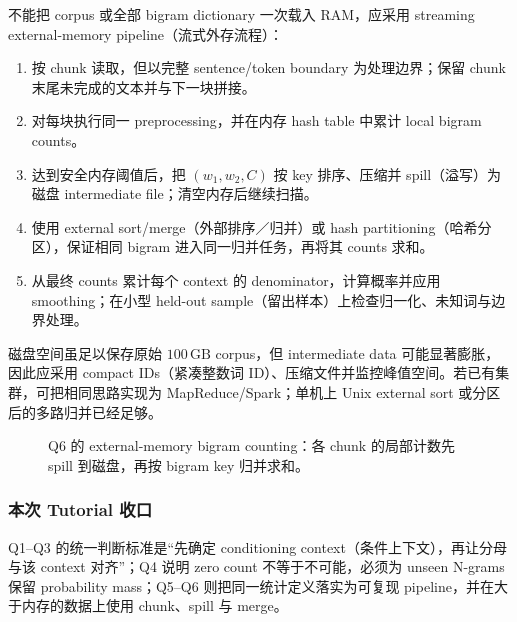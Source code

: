 \begin{checkedsolution}
不能把 corpus 或全部 bigram dictionary 一次载入 RAM，应采用 streaming external-memory pipeline（流式外存流程）：
\begin{enumerate}
  \item 按 chunk 读取，但以完整 sentence/token boundary 为处理边界；保留 chunk 末尾未完成的文本并与下一块拼接。
  \item 对每块执行同一 preprocessing，并在内存 hash table 中累计 local bigram counts。
  \item 达到安全内存阈值后，把 $(w_1,w_2,C)$ 按 key 排序、压缩并 spill（溢写）为磁盘 intermediate file；清空内存后继续扫描。
  \item 使用 external sort/merge（外部排序／归并）或 hash partitioning（哈希分区），保证相同 bigram 进入同一归并任务，再将其 counts 求和。
  \item 从最终 counts 累计每个 context 的 denominator，计算概率并应用 smoothing；在小型 held-out sample（留出样本）上检查归一化、未知词与边界处理。
\end{enumerate}
磁盘空间虽足以保存原始 $100\,\mathrm{GB}$ corpus，但 intermediate data 可能显著膨胀，因此应采用 compact IDs（紧凑整数词 ID）、压缩文件并监控峰值空间。若已有集群，可把相同思路实现为 MapReduce/Spark；单机上 Unix external sort 或分区后的多路归并已经足够。
\end{checkedsolution}

\begin{figure}[htbp]
  \centering
  
  \caption{Q6 的 external-memory bigram counting：各 chunk 的局部计数先 spill 到磁盘，再按 bigram key 归并求和。}
  \label{fig:sc4002-tut03-external-counting}
\end{figure}

\subsubsection*{本次 Tutorial 收口}

Q1--Q3 的统一判断标准是“先确定 conditioning context（条件上下文），再让分母与该 context 对齐”；Q4 说明 zero count 不等于不可能，必须为 unseen N-grams 保留 probability mass；Q5--Q6 则把同一统计定义落实为可复现 pipeline，并在大于内存的数据上使用 chunk、spill 与 merge。
